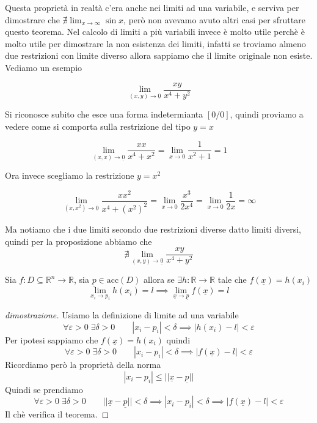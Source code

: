 \documentclass{rapport}
\begin{document}
Questa proprietà in realtà c'era anche nei limiti ad una variabile, e serviva per dimostrare che $\nexists \lim_{x\to \infty} \sin x$, però non avevamo avuto altri casi per sfruttare questo teorema. Nel calcolo di limiti a più variabili invece è molto utile perchè è molto utile per dimostrare la non esistenza dei limiti, infatti se troviamo almeno due restrizioni con limite diverso allora sappiamo che il limite originale non esiste. Vediamo un esempio 

\[
\lim_{(x,y)\to \underline{0}} \dfrac{xy}{x^4+y^2}
\]

Si riconosce subito che esce una forma indetermianta $[0/0]$, quindi proviamo a vedere come si comporta sulla restrizione del tipo $y=x$

\[
\lim_{(x,x)\to \underline{0}}  \dfrac{xx}{x^4+x^2} =\lim_{x\to 0}  \dfrac{1}{x^2+1} = 1  
\]

Ora invece scegliamo la restrizione $y=x^2$

\[
\lim_{(x,x^2)\to \underline{0}}  \dfrac{xx^2}{x^4+(x^2)^2} =\lim_{x\to 0}  \dfrac{x^3}{2x^4} = \lim_{x\to 0}  \dfrac{1}{2x} = \infty   
\]

Ma notiamo che i due limiti secondo due restrizioni diverse datto limiti diversi, quindi per la proposizione abbiamo che 
\[
\nexists\lim_{(x,y)\to \underline{0}}  \dfrac{xy}{x^4+y^2}
\]

\begin{teorema}{}{}
   Sia $f:D\subseteq \mathbb{R}^n \to \mathbb{R}$, sia $\underline{p} \in \text{acc}(D)$ allora se $\exists h:\mathbb{R}\to \mathbb{R}$ tale che $f(\underline{x}) = h(x_i)$
   \[
   \lim_{x_i\to p_i} h(x_i) = l \implies  \lim_{\underline{x} \to \underline{p}} f(\underline{x})  = l
   \]
\end{teorema}
\begin{proof}[dimostrazione]
  Usiamo la definizione di limite ad una variabile 
  \[
  \forall \varepsilon > 0\; \exists \delta > 0 \qquad |x_i-p_i|< \delta \implies |h(x_i) - l| < \varepsilon
  \]
  Per ipotesi sappiamo che $f(\underline{x}) = h(x_i)$ quindi 
  \[
  \forall \varepsilon > 0\; \exists \delta > 0 \qquad |x_i-p_i|< \delta \implies |f(\underline{x}) - l| < \varepsilon
  \]
  Ricordiamo però la proprietà della norma 
  \[
  |x_i-p_i| \leq ||\underline{x} - \underline{p}||
  \]
  Quindi se prendiamo 
   \[
  \forall \varepsilon > 0\; \exists \delta > 0 \qquad ||\underline{x} - \underline{p}||< \delta \implies   |x_i-p_i| <  \delta \implies |f(\underline{x}) - l| < \varepsilon
  \]
  Il chè verifica il teorema.
\end{proof}
\end{document}
